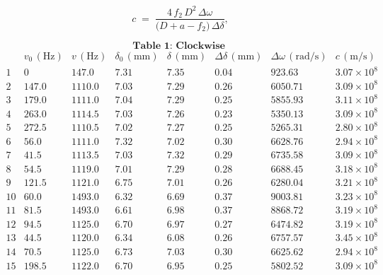 \[
c 
\;=\; 
\frac{4\,f_{2}\,D^{2}\,\Delta\omega}
     {\bigl(D + a - f_{2}\bigr)\,\Delta \delta},
\]  



\[
\textbf{Table 1: Clockwise } 
\]
\[
\begin{array}{c|c|c|c|c|c|c|c}
\text{} 
& v_{0}\,(\text{Hz})
& v\,(\text{Hz})
& \delta_{0}\,(\mathrm{mm})
& \delta\,(\mathrm{mm})
& \Delta \delta\,(\mathrm{mm})
& \Delta \omega\,(\mathrm{rad/s})
& c\,(\mathrm{m/s})
\\ \hline
1 & 0 & 147.0 & 7.31 & 7.35 & 0.04 & 923.63 & 3.07\times10^{8} \\
2 & 147.0 & 1110.0 & 7.03 & 7.29 & 0.26 & 6050.71 & 3.09\times10^{8} \\
3 & 179.0 & 1111.0 & 7.04 & 7.29 & 0.25 & 5855.93 & 3.11\times10^{8} \\
4 & 263.0 & 1114.5 & 7.03 & 7.26 & 0.23 & 5350.13 & 3.09\times10^{8} \\
5 & 272.5 & 1110.5 & 7.02 & 7.27 & 0.25 & 5265.31 & 2.80\times10^{8} \\
6 & 56.0 & 1111.0 & 7.32 & 7.02 & 0.30 & 6628.76 & 2.94\times10^{8} \\
7 & 41.5 & 1113.5 & 7.03 & 7.32 & 0.29 & 6735.58 & 3.09\times10^{8} \\
8 & 54.5 & 1119.0 & 7.01 & 7.29 & 0.28 & 6688.45 & 3.18\times10^{8} \\
9 & 121.5 & 1121.0 & 6.75 & 7.01 & 0.26 & 6280.04 & 3.21\times10^{8} \\
10 & 60.0 & 1493.0 & 6.32 & 6.69 & 0.37 & 9003.81 & 3.23\times10^{8} \\
11 & 81.5 & 1493.0 & 6.61 & 6.98 & 0.37 & 8868.72 & 3.19\times10^{8} \\
12 & 94.5 & 1125.0 & 6.70 & 6.97 & 0.27 & 6474.82 & 3.19\times10^{8} \\
13 & 44.5 & 1120.0 & 6.34 & 6.08 & 0.26 & 6757.57 & 3.45\times10^{8} \\
14 & 70.5 & 1125.0 & 6.73 & 7.03 & 0.30 & 6625.62 & 2.94\times10^{8} \\
15 & 198.5 & 1122.0 & 6.70 & 6.95 & 0.25 & 5802.52 & 3.09\times10^{8} \\
\end{array}
\]

